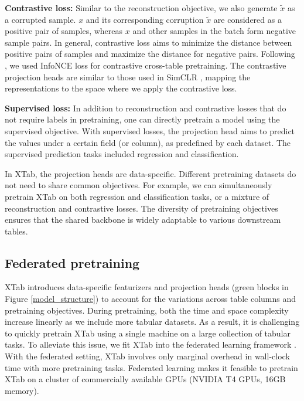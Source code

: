 \textbf{Contrastive loss:} Similar to the reconstruction objective, we also generate $\tilde{x}$ as a corrupted sample. $x$ and its corresponding corruption $\tilde{x}$ are considered as a positive pair of samples, whereas $x$ and other samples in the batch form negative sample pairs. In general, contrastive loss aims to minimize the distance between positive pairs of samples and maximize the distance for negative pairs. Following \citet{bahri2021scarf, chen2020simple}, we used InfoNCE loss for contrastive cross-table pretraining. The contrastive projection heads are similar to those used in SimCLR \citep{chen2020simple}, mapping the representations to the space where we apply the contrastive loss.

\textbf{Supervised loss:} In addition to reconstruction and contrastive losses that do not require labels in pretraining, one can directly pretrain a model using the supervised objective. With supervised losses, the projection head aims to predict the values under a certain field (or column), as predefined by each dataset. The supervised prediction tasks included regression and classification. 

In XTab, the projection heads are data-specific. Different pretraining datasets do not need to share common objectives. For example, we can simultaneously pretrain XTab on both regression and classification tasks, or a mixture of reconstruction and contrastive losses. The diversity of pretraining objectives ensures that the shared backbone is widely adaptable to various downstream tables.

\subsection{Federated pretraining} \label{federated_pretrain} 
XTab introduces data-specific featurizers and projection heads (green blocks in Figure \ref{model_structure}) to account for the variations across table columns and pretraining objectives. During pretraining, both the time and space complexity increase linearly as we include more tabular datasets. As a result, it is challenging to quickly pretrain XTab  using a single machine on a large collection of tabular tasks. To alleviate this issue, we fit XTab into the federated learning framework \citep{mcmahan2017communication}. With the federated setting, XTab involves only marginal overhead in wall-clock time with more pretraining tasks. Federated learning makes it feasible to pretrain XTab on a cluster of commercially available GPUs (NVIDIA T4 GPUs, 16GB memory). 


